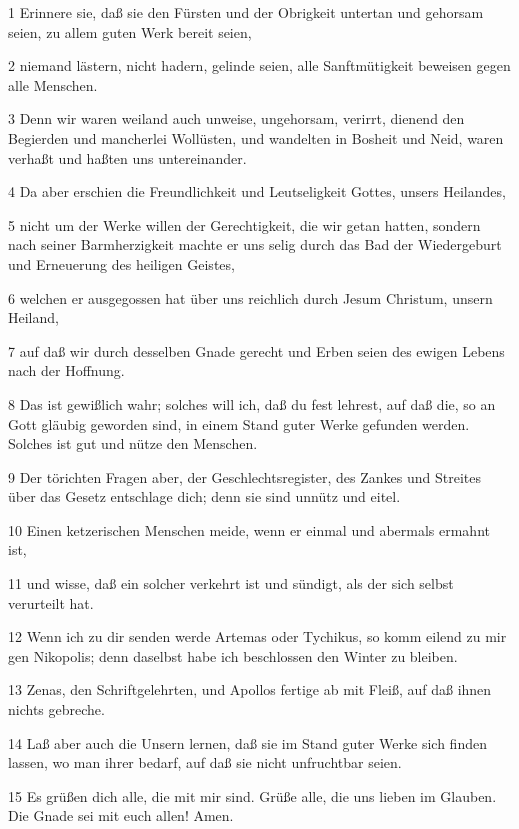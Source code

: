 \par 1 Erinnere sie, daß sie den Fürsten und der Obrigkeit untertan und gehorsam seien, zu allem guten Werk bereit seien,
\par 2 niemand lästern, nicht hadern, gelinde seien, alle Sanftmütigkeit beweisen gegen alle Menschen.
\par 3 Denn wir waren weiland auch unweise, ungehorsam, verirrt, dienend den Begierden und mancherlei Wollüsten, und wandelten in Bosheit und Neid, waren verhaßt und haßten uns untereinander.
\par 4 Da aber erschien die Freundlichkeit und Leutseligkeit Gottes, unsers Heilandes,
\par 5 nicht um der Werke willen der Gerechtigkeit, die wir getan hatten, sondern nach seiner Barmherzigkeit machte er uns selig durch das Bad der Wiedergeburt und Erneuerung des heiligen Geistes,
\par 6 welchen er ausgegossen hat über uns reichlich durch Jesum Christum, unsern Heiland,
\par 7 auf daß wir durch desselben Gnade gerecht und Erben seien des ewigen Lebens nach der Hoffnung.
\par 8 Das ist gewißlich wahr; solches will ich, daß du fest lehrest, auf daß die, so an Gott gläubig geworden sind, in einem Stand guter Werke gefunden werden. Solches ist gut und nütze den Menschen.
\par 9 Der törichten Fragen aber, der Geschlechtsregister, des Zankes und Streites über das Gesetz entschlage dich; denn sie sind unnütz und eitel.
\par 10 Einen ketzerischen Menschen meide, wenn er einmal und abermals ermahnt ist,
\par 11 und wisse, daß ein solcher verkehrt ist und sündigt, als der sich selbst verurteilt hat.
\par 12 Wenn ich zu dir senden werde Artemas oder Tychikus, so komm eilend zu mir gen Nikopolis; denn daselbst habe ich beschlossen den Winter zu bleiben.
\par 13 Zenas, den Schriftgelehrten, und Apollos fertige ab mit Fleiß, auf daß ihnen nichts gebreche.
\par 14 Laß aber auch die Unsern lernen, daß sie im Stand guter Werke sich finden lassen, wo man ihrer bedarf, auf daß sie nicht unfruchtbar seien.
\par 15 Es grüßen dich alle, die mit mir sind. Grüße alle, die uns lieben im Glauben. Die Gnade sei mit euch allen! Amen.

